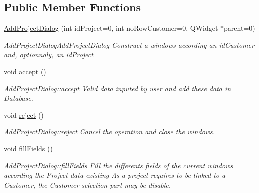 \subsection*{Public Member Functions}
\begin{DoxyCompactItemize}
\item 
\hyperlink{classGui_1_1Dialogs_1_1AddProjectDialog_a73e81dfba4038bfd8d697c012a8a2d97}{Add\-Project\-Dialog} (int id\-Project=0, int no\-Row\-Customer=0, Q\-Widget $\ast$parent=0)
\begin{DoxyCompactList}\small\item\em Add\-Project\-Dialog\-Add\-Project\-Dialog Construct a windows according an {\itshape id\-Customer} and, optionnaly, an {\itshape id\-Project} \end{DoxyCompactList}\item 
\hypertarget{classGui_1_1Dialogs_1_1AddProjectDialog_abe345ededea4911846a44b984cc04f18}{void \hyperlink{classGui_1_1Dialogs_1_1AddProjectDialog_abe345ededea4911846a44b984cc04f18}{accept} ()}\label{classGui_1_1Dialogs_1_1AddProjectDialog_abe345ededea4911846a44b984cc04f18}

\begin{DoxyCompactList}\small\item\em \hyperlink{classGui_1_1Dialogs_1_1AddProjectDialog_abe345ededea4911846a44b984cc04f18}{Add\-Project\-Dialog\-::accept} Valid data inputed by user and add these data in Database. \end{DoxyCompactList}\item 
\hypertarget{classGui_1_1Dialogs_1_1AddProjectDialog_a767dcea1ae96d2efc3085f8ade4406ce}{void \hyperlink{classGui_1_1Dialogs_1_1AddProjectDialog_a767dcea1ae96d2efc3085f8ade4406ce}{reject} ()}\label{classGui_1_1Dialogs_1_1AddProjectDialog_a767dcea1ae96d2efc3085f8ade4406ce}

\begin{DoxyCompactList}\small\item\em \hyperlink{classGui_1_1Dialogs_1_1AddProjectDialog_a767dcea1ae96d2efc3085f8ade4406ce}{Add\-Project\-Dialog\-::reject} Cancel the operation and close the windows. \end{DoxyCompactList}\item 
\hypertarget{classGui_1_1Dialogs_1_1AddProjectDialog_af31b6ed23acdd5fb8b71caaeddce34f4}{void \hyperlink{classGui_1_1Dialogs_1_1AddProjectDialog_af31b6ed23acdd5fb8b71caaeddce34f4}{fill\-Fields} ()}\label{classGui_1_1Dialogs_1_1AddProjectDialog_af31b6ed23acdd5fb8b71caaeddce34f4}

\begin{DoxyCompactList}\small\item\em \hyperlink{classGui_1_1Dialogs_1_1AddProjectDialog_af31b6ed23acdd5fb8b71caaeddce34f4}{Add\-Project\-Dialog\-::fill\-Fields} Fill the differents fields of the current windows according the Project data existing As a project requires to be linked to a Customer, the Customer selection part may be disable. \end{DoxyCompactList}\end{DoxyCompactItemize}


